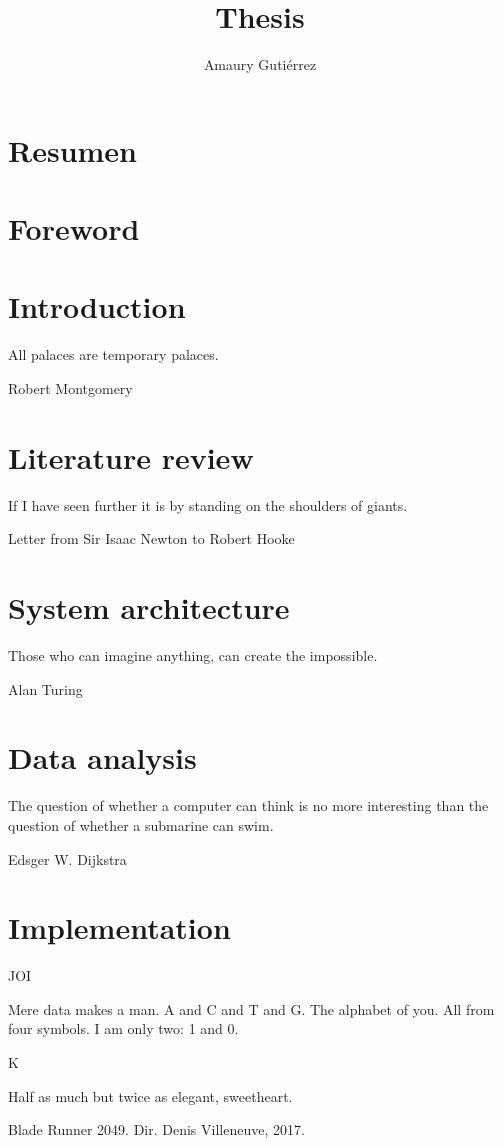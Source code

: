 \documentclass[12pt,letterpaper]{book}
\author{Amaury Guti\'errez}
\title{Thesis}
\theoremstyle{definition} \newtheorem{definition}{Definición}[section]
\theoremstyle{plain} \newtheorem{theorem}{Teorema}[section]
\theoremstyle{plain} \newtheorem{lemma}{Lema}[section]
\theoremstyle{plain} \newtheorem{proposition}[theorem]{Proposici\'on}
\theoremstyle{plain} \newtheorem{corollary}[theorem]{Corolario}
\theoremstyle{plain} \newtheorem{remark}[theorem]{Comentario}
\begin{document}
\frontmatter



\chapter*{Resumen}






\tableofcontents
\chapter{Foreword}


\mainmatter

\chapter{Introduction}
\epigraph{All palaces are temporary palaces.}{Robert Montgomery}


\chapter{Literature review}
\epigraph{If I have seen further it is by standing on the shoulders of giants.}{Letter from Sir Isaac Newton to Robert Hooke}


\chapter{System architecture}
\epigraph{Those who can imagine anything, can create the impossible.}{Alan Turing}


\chapter{Data analysis}
\epigraph{The question of whether a computer can think is no more interesting than the question of whether a submarine can swim.}{Edsger W. Dijkstra}


\chapter{Implementation}
\epigraph{
\begin{center}
JOI
\end{center} 
Mere data makes a man. A and C and T and G. The alphabet of you. All from four symbols. I am only two: 1 and 0.\\
\begin{center}
K
\end{center}
Half as much but twice as elegant, sweetheart.}{Blade Runner 2049. Dir. Denis Villeneuve, 2017.}

\end{document}
